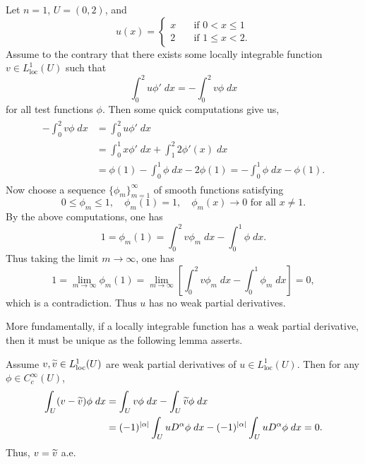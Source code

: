 \documentclass{article}
\numberwithin{equation}{section}
\begin{document}
	\begin{example} 
		Let $n = 1$, $U = (0,2)$, and 
		\begin{equation*}
			u(x) = 
			\begin{cases}
				x & \quad \text{if $0 < x \leq 1$} \\
				2 &\quad \text{if $1 \leq x < 2$}. 
			\end{cases}
		\end{equation*}
		Assume to the contrary that there exists some locally integrable function $v \in L^{1}_{\text{loc}}(U)$ such that 
		\begin{equation*}
			\int_{0}^{2}u\phi'\;dx = -\int_{0}^{2}v\phi\;dx
		\end{equation*}
		for all test functions $\phi$. Then some quick computations give us, 
		\begin{align*}
			\begin{split}
				-\int_{0}^{2}v\phi\;dx &= \int_{0}^{2}u\phi'\;dx \\
				&= \int_{0}^{1}x\phi'\;dx + \int_{1}^{2}2\phi'(x)\;dx \\
				&= \phi(1) - \int_{0}^{1}\phi\;dx -2\phi(1) = -\int_{0}^{1}\phi\;dx - \phi(1). 
			\end{split}
		\end{align*}
		Now choose a sequence $\{\phi_{m}\}_{m = 1}^{\infty}$ of smooth functions satisfying 
		\begin{equation*}
			0 \leq \phi_{m} \leq 1, \quad \phi_{m}(1) = 1, \quad \phi_m(x)\to 0 \text{ for all $x \neq 1$}. 
		\end{equation*}
		By the above computations, one has 
		\begin{equation*}
			1 = \phi_{m}(1) = \int_{0}^{2}v\phi_{m}\;dx -\int_{0}^{1}\phi\;dx. 
		\end{equation*}
		Thus taking the limit $m \to \infty$, one has 
		\begin{equation*}
			1 = \lim_{m \to \infty}\phi_{m}(1) = \lim_{m \to \infty}\left[\int_{0}^{2}v\phi_{m}\;dx - \int_{0}^{1}\phi_{m}\;dx\right] = 0, 
		\end{equation*}
		which is a contradiction. Thus $u$ has no weak partial derivatives.
	\end{example}
	
	More fundamentally, if a locally integrable function has a weak partial derivative, then it must be unique as the following lemma asserts. 
	\begin{lemma}
		Assume $v, \widetilde{v} \in L^{1}_{\text{loc}}(U)$ are weak partial derivatives of $u \in L^{1}_{\text{loc}}(U)$. Then for any $\phi \in C_{c}^{\infty}(U)$, 
		\begin{align*}
			\begin{split}
				\int_{U}(v - \widetilde{v})\phi\;dx &= \int_{U}v\phi\;dx - \int_{U}\widetilde{v}\phi\;dx \\
				&= (-1)^{|\alpha|}\int_{U}uD^\alpha \phi\;dx - (-1)^{|\alpha|}\int_{U}uD^\alpha \phi\;dx = 0. 
			\end{split}
		\end{align*}
		Thus, $v = \widetilde{v}$ a.e. 
	\end{lemma}
	
\end{document}
